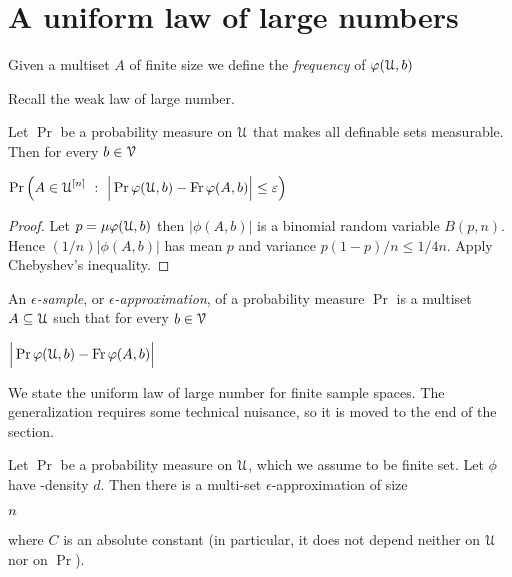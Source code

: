 \documentclass[sputnik.tex]{subfiles}
\begin{document}
\section{A uniform law of large numbers}

Given a multiset $A$ of finite size we define the \emph{frequency\/} of $\varphi(\EuScript U,b)$ 


Recall the weak law of large number.

\begin{proposition} 
Let $\Pr$ be a probability measure on $\EuScript U$ that makes all definable sets measurable.
Then for every $b\in\EuScript V$

\def\ceq#1#2#3{\parbox[t]{45ex}{$\displaystyle #1$}\medrel{#2}{$\displaystyle #3$}}

\ceq{\hfill\displaystyle\Pr \Big(A\in\U^{[n]}\ :\ \Big|\Pr\phi(\U,b) - \Fr\phi(A,b)\Big|\le\epsilon\Big)}{\ge}{1-\frac{1}{4n\epsilon^2}}
\end{proposition}

\begin{proof}
Let $p=\mu\varphi(\EuScript U,b)$ then $\big|\phi(A,b)\big|$ is a binomial random variable $B(p,n)$.
Hence $(1/n)\big|\phi(A,b)\big|$ has mean $p$ and variance $p(1-p)/n\le 1/4n$.
Apply Chebyshev's inequality.
\end{proof}


An \emph{$\epsilon$-sample}, or \emph{$\epsilon$-approximation}, of a probability measure $\Pr$ is a multiset $A\subseteq\EuScript U$ such that for every $b\in\EuScript V$

\def\ceq#1#2#3{\parbox[t]{30ex}{$\displaystyle #1$}\medrel{#2}{$\displaystyle #3$}}

\ceq{\hfill\displaystyle \Big|\Pr\phi(\U,b) - \Fr\phi(A,b)\Big|}{\le}{\epsilon}

We state the uniform law of large number for finite sample spaces.
The generalization requires some technical nuisance, so it is moved to the end of the section.


\begin{proposition} 
Let $\Pr$ be a probability measure on $\EuScript U$, which we assume to be finite set.
Let $\phi$ have \vc-density $d$. Then there is a multi-set $\epsilon$-approximation of size 

\ceq{\hfill n}{\le}{C\frac{d}{\epsilon^2}\ln\frac1\epsilon,}

where $C$ is an absolute constant (in particular, it does not depend neither on $\EuScript U$ nor on $\Pr$).
\end{proposition}
\end{document}
